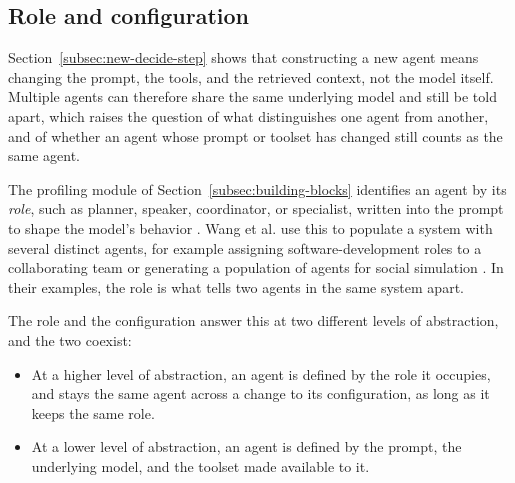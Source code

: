 \subsection{Role and configuration}
\label{subsec:agent-identity}

Section~\ref{subsec:new-decide-step} shows that constructing a new agent means changing the prompt, the tools, and the retrieved context, not the model itself. Multiple agents can therefore share the same underlying model and still be told apart, which raises the question of what distinguishes one agent from another, and of whether an agent whose prompt or toolset has changed still counts as the same agent.

The profiling module of Section~\ref{subsec:building-blocks} identifies an agent by its \emph{role}, such as planner, speaker, coordinator, or specialist, written into the prompt to shape the model's behavior \cite{wangSurveyLargeLanguage2024}. Wang et al. use this to populate a system with several distinct agents, for example assigning software-development roles to a collaborating team or generating a population of agents for social simulation \cite{wangSurveyLargeLanguage2024}. In their examples, the role is what tells two agents in the same system apart.

The role and the configuration answer this at two different levels of abstraction, and the two coexist:

\begin{itemize}
	\item At a higher level of abstraction, an agent is defined by the role it occupies, and stays the same agent across a change to its configuration, as long as it keeps the same role.
	\item At a lower level of abstraction, an agent is defined by the prompt, the underlying model, and the toolset made available to it.
\end{itemize}

